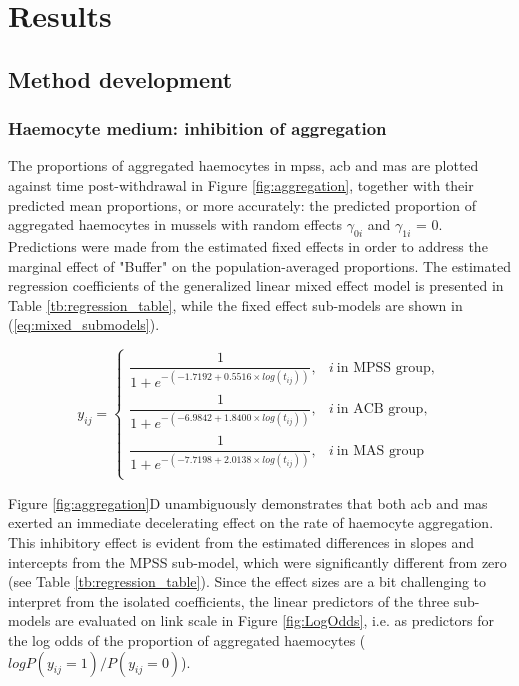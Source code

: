 \chapter{Results}
\label{chap:results}

\section{Method development}
\label{section:Results_Method_Development}
\subsection{Haemocyte medium: inhibition of aggregation}
The proportions of aggregated haemocytes in \acrshort{mpss}, \acrshort{acb} and \acrshort{mas} are plotted against time post-withdrawal in Figure \ref{fig:aggregation}, together with their predicted mean proportions, or more accurately: the predicted proportion of aggregated haemocytes in mussels with random effects $\gamma_{0i}$ and $\gamma_{1i}$ = 0. Predictions were made from the estimated fixed effects in order to address the marginal effect of "Buffer" on the population-averaged proportions. The estimated regression coefficients of the generalized linear mixed effect model is presented in Table \ref{tb:regression_table}, while the fixed effect sub-models are shown in (\ref{eq:mixed_submodels}).

\begin{equation}
    \label{eq:mixed_submodels}
    y_{ij} = \begin{cases}
        \dfrac{1}{1 + e^{-(-1.7192 + 0.5516 \times log(t_{ij}))}},  & i \: \text{in MPSS group}, \\
        \dfrac{1}{1 + e^{-(-6.9842 + 1.8400 \times log(t_{ij}))}},  & i \: \text{in ACB group}, \\
        \dfrac{1}{1 + e^{-(-7.7198 + 2.0138 \times log(t_{ij}))}},  & i \: \text{in MAS group} \\
    \end{cases}
\end{equation}

Figure \ref{fig:aggregation}D unambiguously demonstrates that both \acrshort{acb} and \acrshort{mas} exerted an immediate decelerating effect on the rate of haemocyte aggregation. This inhibitory effect is evident from the estimated differences in slopes and intercepts from the MPSS sub-model, which were significantly different from zero (see Table \ref{tb:regression_table}). Since the effect sizes are a bit challenging to interpret from the isolated coefficients, the linear predictors of the three sub-models are evaluated on link scale in Figure \ref{fig:LogOdds}, i.e. as predictors for the log odds of the proportion of aggregated haemocytes ($log P(y_{ij} = 1) / P(y_{ij} = 0)$).

